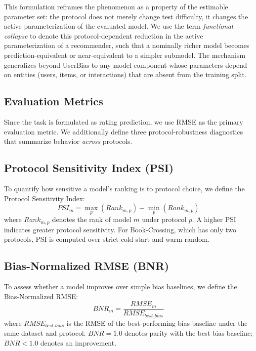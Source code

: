 \documentclass[journal]{IEEEtran}
\begin{document}
This formulation reframes the phenomenon as a property of the estimable parameter set: the protocol does not merely change test difficulty, it changes the active parameterization of the evaluated model. We use the term \emph{functional collapse} to denote this protocol-dependent reduction in the active parameterization of a recommender, such that a nominally richer model becomes prediction-equivalent or near-equivalent to a simpler submodel. The mechanism generalizes beyond UserBias to any model component whose parameters depend on entities (users, items, or interactions) that are absent from the training split.

\subsection{Evaluation Metrics}
\label{sec:metrics}

Since the task is formulated as rating prediction, we use RMSE as the primary evaluation metric. We additionally define three protocol-robustness diagnostics that summarize behavior \emph{across} protocols.

\subsection{Protocol Sensitivity Index (PSI)}
\label{sec:psi}

To quantify how sensitive a model's ranking is to protocol choice, we define the Protocol Sensitivity Index:
\begin{equation}
PSI_m = \max_{p}(Rank_{m,p}) - \min_{p}(Rank_{m,p})
\label{eq:psi}
\end{equation}
where $Rank_{m,p}$ denotes the rank of model $m$ under protocol $p$. A higher PSI indicates greater protocol sensitivity. For Book-Crossing, which has only two protocols, PSI is computed over strict cold-start and warm-random.

\subsection{Bias-Normalized RMSE (BNR)}
\label{sec:bnr_def}

To assess whether a model improves over simple bias baselines, we define the Bias-Normalized RMSE:
\begin{equation}
BNR_m = \frac{RMSE_m}{RMSE_{best\_bias}}
\label{eq:bnr}
\end{equation}
where $RMSE_{best\_bias}$ is the RMSE of the best-performing bias baseline under the same dataset and protocol. $BNR=1.0$ denotes parity with the best bias baseline; $BNR<1.0$ denotes an improvement.
\end{document}
